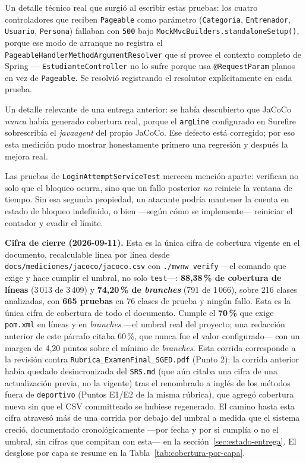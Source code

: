 \documentclass[11pt,a4paper]{article}
\newcommand{\ruta}[1]{\texttt{\footnotesize #1}}
\begin{document}
Un detalle técnico real que surgió al escribir estas pruebas: los cuatro
controladores que reciben \texttt{Pageable} como parámetro
(\texttt{Categoria}, \texttt{Entrenador}, \texttt{Usuario}, \texttt{Persona})
fallaban con \texttt{500} bajo \texttt{MockMvcBuilders.standaloneSetup()},
porque ese modo de arranque no registra el
\texttt{PageableHandlerMethodArgumentResolver} que sí provee el contexto
completo de Spring — \texttt{EstudianteController} no lo sufre porque usa
\texttt{@RequestParam} planos en vez de \texttt{Pageable}. Se resolvió
registrando el resolutor explícitamente en cada prueba.

Un detalle relevante de una entrega anterior: se había descubierto que
JaCoCo \emph{nunca} había generado cobertura real, porque el
\texttt{argLine} configurado en Surefire sobrescribía el \emph{javaagent}
del propio JaCoCo. Ese defecto está corregido; por eso esta medición pudo
mostrar honestamente primero una regresión y después la mejora real.

Las pruebas de \texttt{LoginAttemptServiceTest} merecen mención aparte:
verifican no solo que el bloqueo ocurra, sino que un fallo posterior
\emph{no} reinicie la ventana de tiempo. Sin esa segunda propiedad, un
atacante podría mantener la cuenta en estado de bloqueo indefinido, o bien
—según cómo se implemente— reiniciar el contador y evadir el límite.

\textbf{Cifra de cierre (2026-09-11).} Esta es la única cifra de
cobertura vigente en el documento, recalculable línea por línea desde
\ruta{docs/mediciones/jacoco/jacoco.csv} con
\texttt{./mvnw verify} —el comando que exige y hace cumplir el umbral,
no solo \texttt{test}—:
\textbf{88,38\,\% de cobertura de líneas} (3\,013 de 3\,409) y
\textbf{74,20\,\% de \emph{branches}} (791 de 1\,066), sobre 216 clases
analizadas, con \textbf{665 pruebas} en 76 clases de prueba y ningún
fallo. Esta es la única cifra de cobertura de todo el documento. Cumple
el \textbf{70\,\%} que exige \texttt{pom.xml} en líneas y en
\emph{branches} —el umbral real del proyecto; una redacción anterior de
este párrafo citaba 60\,\%, que nunca fue el valor configurado— con un
margen de 4,20 puntos sobre el mínimo de \emph{branches}. Esta corrida
corresponde a la revisión contra \texttt{Rubrica\_ExamenFinal\_SGED.pdf}
(Punto 2): la corrida anterior había quedado desincronizada del
\texttt{SRS.md} (que aún citaba una cifra de una actualización previa,
no la vigente) tras el renombrado a inglés de los métodos fuera de
\texttt{deportivo} (Puntos E1/E2 de la misma rúbrica), que agregó
cobertura nueva sin que el CSV committeado se hubiese regenerado. El
camino hasta esta cifra atravesó más de una corrida por debajo del
umbral a medida que el sistema creció, documentado cronológicamente
—por fecha y por si cumplía o no el umbral, sin cifras que compitan con
esta— en la sección~\ref{sec:estado-entrega}. El desglose por capa se
resume en la Tabla~\ref{tab:cobertura-por-capa}.
\end{document}
